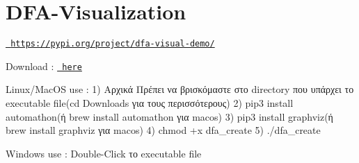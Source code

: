 \chapter{DFA-\/\+Visualization}
\hypertarget{index}{}\label{index}
\label{index_md__2_users_2spirosmag_2_documents_2_d_f_a___visualization_2_r_e_a_d_m_e}%
%
 \href{https://pypi.org/project/dfa-visual-demo/}{\texttt{ https\+://pypi.\+org/project/dfa-\/visual-\/demo/}}

Download \+: \href{https://github.com/spirosmaggioros/DFA_Visualization/releases/tag/v0.1}{\texttt{ here}}

Linux/\+Mac\+OS use \+: 1) Αρχικά Πρέπει να βρισκόμαστε στο directory που υπάρχει το executable file(cd Downloads για τους περισσότερους) 2) pip3 install automathon(ή brew install automathon για macos) 3) pip3 install graphviz(ή brew install graphviz για macos) 4) chmod +x dfa\+\_\+create 5) ./dfa\+\_\+create

Windows use \+: Double-\/\+Click το executable file

 